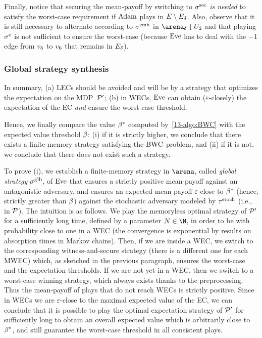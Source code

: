 \begin{example}
Finally, notice that securing the mean-payoff by switching to  $\sigma^{\text{sec}}$ \textit{is needed} to satisfy the worst-case requirement if $\text{Adam}$ plays in $E \setminus E_{\delta}$. Also, observe that it is still necessary to alternate according to $\sigma^{\text{cmb}}$ in $\gameNonZero \reduc \ec_{2}$ and that playing $\sigma^{\text{e}}$ is not sufficient to ensure the worst-case (because $\text{Eve}$ has to deal with the $-1$ edge from $v_{8}$ to $v_{6}$ that remains in $E_{\delta}$).
\end{example}


\subsubsection*{Global strategy synthesis} In summary, (a) LECs should be avoided and will be by a strategy that optimizes the expectation on the MDP~${\mathcal{P}} '$; (b) in WECs, $\text{Eve}$ can obtain ($\varepsilon$-closely) the expectation of the EC \textit{and} ensure the worst-case threshold.

Hence, we finally compare the value $\beta^{\ast}$ computed by~\cref{13-algo:BWC} with the expected value threshold $\beta$: (i) if it is strictly higher, we conclude that there exists a finite-memory strategy satisfying the $\text{BWC}$ problem, and (ii) if it is not, we conclude that there does not exist such a strategy.

To prove (i), we establish a finite-memory strategy in $\arena$, called \textit{global strategy} $\sigma^{\text{glb}}$, of $\text{Eve}$ that ensures a strictly positive mean-payoff against an antagonistic adversary, and ensures an expected mean-payoff $\varepsilon$-close to $\beta^{\ast}$ (hence, strictly greater than $\beta$) against the stochastic adversary modeled by $\tau^{\text{stoch}} $ (i.e., in ${\mathcal{P}} $). The intuition is as follows. We play the memoryless optimal strategy of ${\mathcal{P}} '$ for a sufficiently long time, defined by a parameter $\stepsGlobal \in \N$, in order to be with probability close to one in a WEC (the convergence is exponential by results on absorption times in Markov chains). Then, if we are inside a WEC, we switch to the corresponding witness-and-secure strategy (there is a different one for each MWEC) which, as sketched in the previous paragraph, ensures the worst-case and the expectation thresholds. If we are not yet in a WEC, then we switch to a worst-case winning strategy, which always exists thanks to the preprocessing. Thus the mean-payoff of plays that do not reach WECs is strictly positive. Since in WECs we are $\varepsilon$-close to the maximal expected value of the EC, we can conclude that it is possible to play the optimal expectation strategy of ${\mathcal{P}} '$ for sufficiently long to obtain an overall expected value which is arbitrarily close to $\beta^{\ast}$, and still guarantee the worst-case threshold in all consistent plays.

